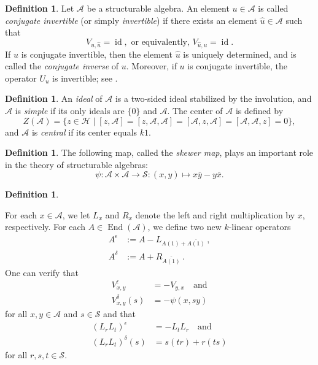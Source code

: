 \documentclass[oneside,a4paper]{amsart} %
\theoremstyle{definition}
\newtheorem{definition}[theorem]{Definition}
\DeclareMathOperator{\id}{id}
\DeclareMathOperator{\End}{End}
\newcommand{\A}{\mathcal{A}}
\renewcommand{\SS}{\mathcal{S}}
\numberwithin{equation}{section}
\begin{document}
\begin{definition}

	Let $\A$ be a structurable algebra. 
	An element $u \in \A$ is called \textit{conjugate invertible} (or simply \textit{invertible}) if there exists an element $\hat u \in \A$ such that
	 	$$ V_{u,\hat u} = \id, \text{ or equivalently, } V_{\hat u,u} = \id. $$
	If $u$ is conjugate invertible, then the element $\hat u$ is uniquely determined, and is called the \textit{conjugate inverse} of $u$.
	Moreover, if $u$ is conjugate invertible, the operator $U_u$ is invertible; see \cite[Section 6]{Allison1981}.
\end{definition}

\begin{definition}
	An \textit{ideal} of $\A$ is a two-sided ideal stabilized by the involution, and $\A$ is \textit{simple} if its only ideals are $\{0\}$ and $\A$.
	The center of $\A$ is defined by
	\[ Z(\A)=\{z\in \mathcal H \mid [z,\A]=[z,\A,\A]=[\A,z,\A]=[\A,\A,z]=0\},\]
	and $\A$ is \textit{central} if its center equals $k1$.
\end{definition}

\begin{definition}\label{def:skewer}
	The following map, called the \textit{skewer map}, plays an important role in the theory of structurable algebras:
	\[ \psi \colon \A\times \A\rightarrow \mathcal S \colon (x,y)\mapsto x\overline y-y\overline x .\]
\end{definition}


\begin{definition}\label{def:epsilon delta}

For each $x \in \A$, we let $L_x$ and $R_x$ denote the left and right multiplication by $x$, respectively. 
For each $A\in\End (\A)$, we define two new $k$-linear operators 
\begin{align*}
	A^\epsilon &:= A-L_{A(1)+\overline{A(1)}}\,, \\
	A^\delta &:= A+R_{\overline{A(1)}}\,.
\end{align*}
One can verify that 
\begin{align}
	V_{x,y}^\epsilon &= -V_{y,x} \quad \text{and} \label{formula:V epsilon} \\ 
	V_{x,y}^\delta (s) &= -\psi (x,sy) \label{formula:V delta}
\end{align}
for all $x,y\in \A$ and $s\in \SS$
and that
\begin{align}
	(L_rL_t)^\epsilon & = -L_tL_r \quad \text{and} \label{formula:Ls epsilon} \\
	(L_rL_t)^\delta(s) & = s(tr)+r(ts) \label{formula:Ls delta}
\end{align}
for all $r,s,t \in \SS$.
\end{definition}
\end{document}
